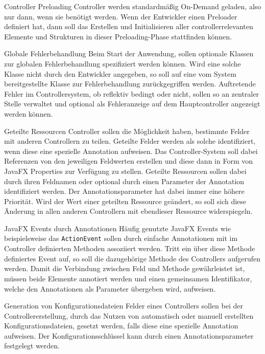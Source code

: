 \begin{freq}{Controller Preloading}
	Controller werden standardmäßig On-Demand geladen, also nur dann, wenn sie benötigt werden. Wenn der Entwickler einen Preloader definiert hat, dann soll das Erstellen und Initialisieren aller controllerrelevanten Elemente und Strukturen in dieser Preloading-Phase stattfinden können.
\end{freq}
\begin{freq}{Globale Fehlerbehandlung}
	Beim Start der Anwendung, sollen optionale Klassen zur globalen Fehlerbehandlung spezifiziert werden können. Wird eine solche Klasse nicht durch den Entwickler angegeben, so soll auf eine vom System bereitgestellte Klasse zur Fehlerbehandlung zurückgegriffen werden. Auftretende Fehler im Controllersystem, ob reflektiv bedingt oder nicht, sollen so an zentraler Stelle verwaltet und optional als Fehleranzeige auf dem Hauptcontroller angezeigt werden können.
\end{freq}
\begin{freq}{Geteilte Ressourcen}
	Controller sollen die Möglichkeit haben, bestimmte Felder mit anderen Controllern zu teilen. Geteilte Felder werden als solche identifiziert, wenn diese eine spezielle Annotation aufweisen. Das Controller-System soll dabei Referenzen von den jeweiligen Feldwerten erstellen und diese dann in Form von JavaFX Properties zur Verfügung zu stellen. Geteilte Ressourcen sollen dabei durch ihren Feldnamen oder optional durch einen Parameter der Annotation identifiziert werden. Der Annotationsparameter hat dabei immer eine höhere Priorität. Wird der Wert einer geteilten Ressource geändert, so soll sich diese Änderung in allen anderen Controllern mit ebendieser Ressource widerspiegeln.
\end{freq}
\begin{freq}{JavaFX Events durch Annotationen}
	Häufig genutzte JavaFX Events wie beispielsweise das \texttt{ActionEvent} sollen durch einfache Annotationen mit im Controller definierten Methoden assoziiert werden. Tritt ein über diese Methode definiertes Event auf, so soll die dazugehörige Methode des Controllers aufgerufen werden. Damit die Verbindung zwischen Feld und Methode gewährleistet ist, müssen beide Elemente annotiert werden und einen gemeinsamen Identifikator, welche den Annotationen als Parameter übergeben wird, aufweisen.
\end{freq}
\begin{freq}{Generation von Konfigurationsdateien}
	Felder eines Controllers sollen bei der Controllererstellung, durch das Nutzen von automatisch oder manuell erstellten Konfigurationsdateien, gesetzt werden, falls diese eine spezielle Annotation aufweisen. Der Konfigurationsschlüssel kann durch einen Annotationsparameter festgelegt werden.
\end{freq}
